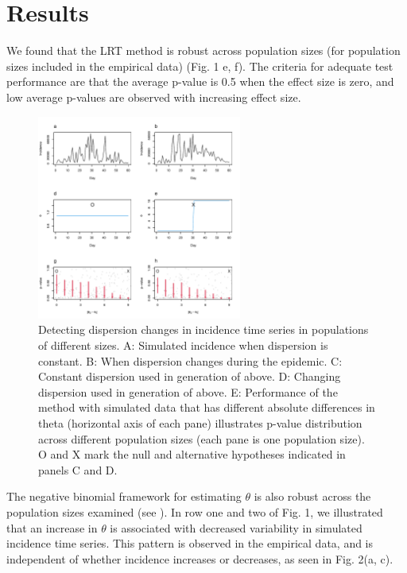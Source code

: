 \documentclass[10pt,letterpaper]{article}
\begin{document}
\section*{Results}
We found that the LRT method is robust across population sizes (for population sizes included in the empirical data) (Fig. 1 e, f).
The criteria for adequate test performance are that the average p-value is 0.5 when the effect size is zero, and low average p-values are observed with increasing effect size. 
\begin{figure}[!h]
\includegraphics[width=0.6\textwidth]{fig1}
\caption{
Detecting dispersion changes in incidence time series in populations of different sizes. A: Simulated incidence when dispersion is constant. B: When dispersion changes during the epidemic. C: Constant dispersion used in generation of above. D: Changing dispersion used in generation of above. E: Performance of the method with simulated data that has different absolute differences in theta (horizontal axis of each pane) illustrates p-value distribution across different population sizes (each pane is one population size). O and X mark the null and alternative hypotheses indicated in panels C and D. 
 }
\label{fig1}
\end{figure}
The negative binomial framework for estimating \begin{math}\theta\end{math} is also robust across the population sizes examined (see ).
In row one and two of Fig. 1, we illustrated that an increase in \begin{math}\theta\end{math} is associated with decreased variability in simulated incidence time series. This pattern is observed in the empirical data, and is independent of whether incidence increases or decreases, as seen in Fig. 2(a, c).
\end{document}
